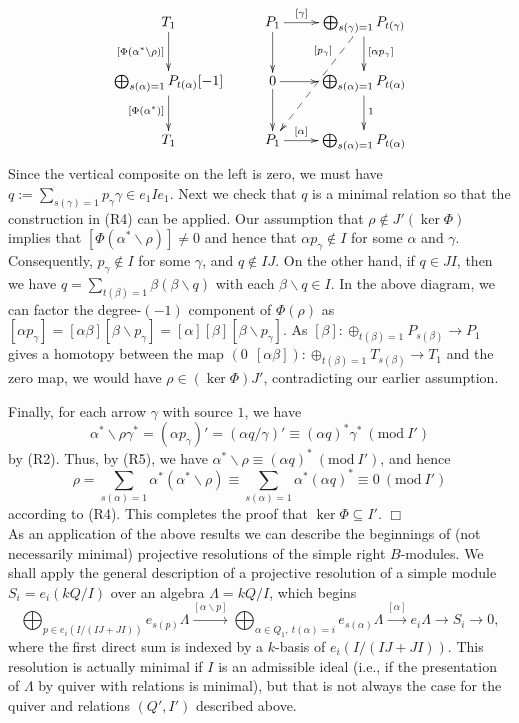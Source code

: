 \documentclass{amsart}
\begin{document}
$$\xymatrix{T_1 \ar[d]_{[\Phi(\alpha^* \backslash \rho)]} & P_1 \ar[r]^-{[\gamma]} \ar[d] & \bigoplus_{s(\gamma)=1} P_{t(\gamma)} \ar[d]^{[\alpha p_{\gamma}]} \ar@{-->}[ddl]_(.3){[p_{\gamma}]} \\ \bigoplus_{s(\alpha)=1} P_{t(\alpha)}[-1] \ar[d]_{[\Phi(\alpha^*)]} & 0 \ar[r] \ar[d] & \bigoplus_{s(\alpha)=1} P_{t(\alpha)} \ar[d]^{1} \\ T_1 & P_1 \ar[r]^-{[\alpha]} & \bigoplus_{s(\alpha)=1} P_{t(\alpha)}}$$
Since the vertical composite on the left is zero, we must have $q := \sum_{s(\gamma)=1} p_{\gamma} \gamma \in e_1 I e_1$.  Next we check that $q$ is a minimal relation so that the construction in (R4) can be applied.  Our assumption that $\rho \notin J'(\ker \Phi)$ implies that $[\Phi(\alpha^* \backslash \rho)] \neq 0$ and hence that $\alpha p_{\gamma} \notin I$ for some $\alpha$ and $\gamma$.   Consequently, $p_{\gamma} \notin I$ for some $\gamma$, and $q \notin IJ$.   On the other hand, if $q \in JI$, then we have $q = \sum_{t(\beta)=1} \beta (\beta \backslash q)$ with each $\beta \backslash q \in I$.  In the above diagram, we can factor the degree-$(-1)$ component of $\Phi(\rho)$ as $[\alpha p_{\gamma}] = [\alpha \beta] [ \beta \backslash p_{\gamma}] = [\alpha] [\beta] [\beta \backslash p_{\gamma}]$.   As $[\beta] : \oplus_{t(\beta)=1} P_{s(\beta)} \rightarrow P_1$ gives a homotopy between the map $(0\ \  [\alpha \beta]) : \oplus_{t(\beta)=1} T_{s(\beta)} \rightarrow T_1$ and the zero map, we would have  $\rho \in (\ker \Phi)J'$, contradicting our earlier assumption.   
 
Finally, for each arrow $\gamma$ with source $1$, we have $$\alpha^* \backslash \rho \gamma^* = (\alpha p_{\gamma})' = (\alpha q / \gamma)' \equiv (\alpha q)^* \gamma^* \ (\mbox{mod}\ I')$$ by (R2).   Thus, by (R5), we have $\alpha^* \backslash \rho \equiv (\alpha q)^*\ (\mbox{mod}\ I')$, and hence $$\rho = \sum_{s(\alpha)=1} \alpha^* (\alpha^* \backslash \rho) \equiv \sum_{s(\alpha)=1} \alpha^* (\alpha q)^* \equiv 0 \ (\mbox{mod}\ I')$$
according to (R4).  This completes the proof that $\ker \Phi \subseteq I'$.  $\Box$ \\

\vspace{2mm}
As an application of the above results we can describe the beginnings of (not necessarily minimal) projective resolutions of the simple right $B$-modules.  %
We shall apply the general description of a projective resolution of a simple module $S_i = e_i(kQ/I)$ over an algebra $\Lambda = kQ/I$, which begins
 $$\bigoplus_{p \in e_i(I/(IJ + JI))} e_{s(p)}\Lambda  \stackrel{[\alpha \backslash p]}{\longrightarrow} \bigoplus_{\alpha \in Q_1,\ t(\alpha)=i} e_{s(\alpha)}\Lambda \stackrel{[\alpha]}{\longrightarrow} e_i \Lambda \longrightarrow S_i \rightarrow 0,$$
 where the first direct sum is indexed by a $k$-basis of $e_i(I/(IJ+JI))$.  This resolution is actually minimal if $I$ is an admissible ideal (i.e., if the presentation of $\Lambda$ by quiver with relations is minimal), but that is not always the case for the quiver and relations $(Q',I')$ described above.
\end{document}
